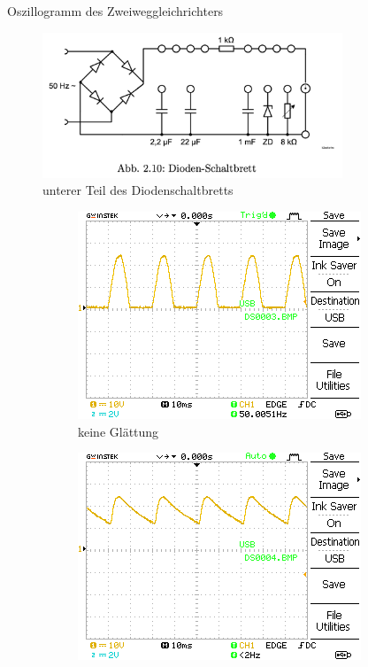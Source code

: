 \documentclass{article}
\theoremstyle{definition}
\begin{document}
\begin{aufgabe}{Oszillogramm des Zweiweggleichrichters}
    \aufbau
    \begin{figure}[H]
        \centering
        \includegraphics[width=0.8\textwidth]{figs/Aufbau4.png}
        \caption{unterer Teil des Diodenschaltbretts\cite{anleitung}}
        \label{aufbau4}
    \end{figure}
    \messwerte
    \begin{figure}[H]
        \begin{subfigure}[b]{0.49 \textwidth}
            \includegraphics[width=\textwidth]{MesswerteVersuch2/DS0003.png}
            \caption{keine Glättung}
            \label{a3_a}
        \end{subfigure}
        \hfill
        \begin{subfigure}[b]{0.49 \textwidth}
            \includegraphics[width=\textwidth]{MesswerteVersuch2/DS0004.png}

\end{subfigure}
\end{figure}
\end{aufgabe}
\end{document}
